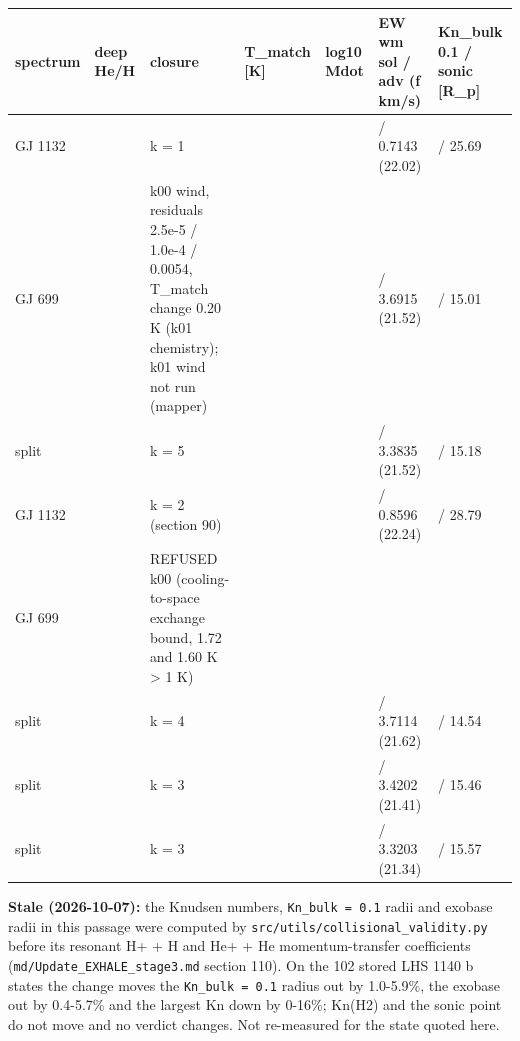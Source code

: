 \documentclass[english,a4paper]{my_memo}
\begin{document}
{\def\LTcaptype{none} %
{\small
\begin{longtable}[]{@{}>{\raggedright\arraybackslash}p{\dimexpr(\linewidth-14\tabcolsep)/7\relax}>{\raggedright\arraybackslash}p{\dimexpr(\linewidth-14\tabcolsep)/7\relax}>{\raggedright\arraybackslash}p{\dimexpr(\linewidth-14\tabcolsep)/7\relax}>{\raggedright\arraybackslash}p{\dimexpr(\linewidth-14\tabcolsep)/7\relax}>{\raggedright\arraybackslash}p{\dimexpr(\linewidth-14\tabcolsep)/7\relax}>{\raggedright\arraybackslash}p{\dimexpr(\linewidth-14\tabcolsep)/7\relax}>{\raggedright\arraybackslash}p{\dimexpr(\linewidth-14\tabcolsep)/7\relax}@{}}
\toprule\noalign{}
spectrum & deep He/H & closure & T\_match {[}K{]} & log10 Mdot & EW wm sol / adv (f km/s) & Kn\_bulk 0.1 / sonic {[}R\_p{]} \\
\midrule\noalign{}
\endhead
\bottomrule\noalign{}
\endlastfoot
GJ 1132 & 2.09 & k = 1 & 350.71 & 7.8864 & 0.7109 / 0.7143 (22.02) & 5.70 / 25.69 \\
GJ 699 & 2.09 & k00 wind, residuals 2.5e-5 / 1.0e-4 / 0.0054, T\_match change 0.20 K (k01 chemistry); k01 wind not run (mapper) & 329.74 & 8.7080 & 3.6977 / 3.6915 (21.52) & 8.46 / 15.01 \\
split & 2.09 & k = 5 & 264.59 & 8.6544 & 3.3876 / 3.3835 (21.52) & 7.88 / 15.18 \\
GJ 1132 & 0.65 & k = 2 (section 90) & 412.59 & 8.1325 & 0.8529 / 0.8596 (22.24) & 8.57 / 28.79 \\
GJ 699 & 0.65 & REFUSED k00 (cooling-to-space exchange bound, 1.72 and 1.60 K \textgreater{} 1 K) & & & & \\
split & 0.65 & k = 4 & 401.53 & 8.8152 & 3.7065 / 3.7114 (21.62) & 11.54 / 14.54 \\
split & 5.0 & k = 3 & 271.78 & 8.6686 & 3.4270 / 3.4202 (21.41) & 7.23 / 15.46 \\
split & 10.0 & k = 3 & 280.31 & 8.6617 & 3.3276 / 3.3203 (21.34) & 6.82 / 15.57 \\
\end{longtable}
}
}

\textbf{Stale (2026-10-07):} the Knudsen numbers, \texttt{Kn\_bulk\ =\ 0.1} radii and exobase radii in this passage were computed by \texttt{src/utils/collisional\_validity.py} before its resonant H+ + H and He+ + He momentum-transfer coefficients (\texttt{md/Update\_EXHALE\_stage3.md} section 110). On the 102 stored LHS 1140 b states the change moves the \texttt{Kn\_bulk\ =\ 0.1} radius out by 1.0-5.9\%, the exobase out by 0.4-5.7\% and the largest Kn down by 0-16\%; Kn(H2) and the sonic point do not move and no verdict changes. Not re-measured for the state quoted here.
\end{document}
